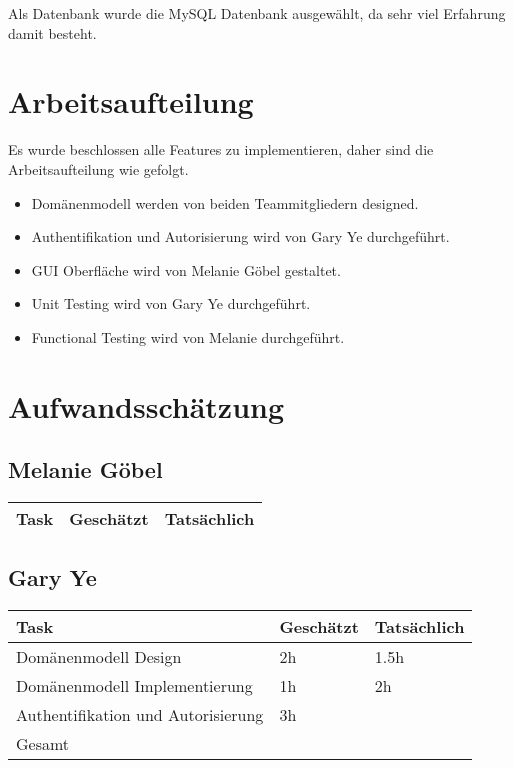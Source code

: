 \documentclass[11pt, a4paper]{article}
\begin{document}
Als Datenbank wurde die MySQL Datenbank ausgewählt, da sehr viel Erfahrung damit besteht.

\section{Arbeitsaufteilung}

Es wurde beschlossen alle Features zu implementieren, daher sind die Arbeitsaufteilung wie gefolgt. 

\begin{itemize}
  \item Domänenmodell werden von beiden Teammitgliedern designed.
  \item Authentifikation und Autorisierung wird von Gary Ye durchgeführt.
  \item GUI Oberfläche wird von Melanie Göbel gestaltet.
  \item Unit Testing wird von Gary Ye durchgeführt.
  \item Functional Testing wird von Melanie durchgeführt.
\end{itemize}

\section{Aufwandsschätzung}

\subsection*{Melanie Göbel}
\begin{center}
  \begin{tabular}{| l | l | l |}
    \hline
    Task & Geschätzt & Tatsächlich \\ \hline
    
  \end{tabular}
\end{center}


\subsection*{Gary Ye}
\begin{center}
  \begin{tabular}{| l | l | l |}
    \hline
    Task & Geschätzt & Tatsächlich \\ \hline
    Domänenmodell Design & 2h & 1.5h \\ \hline
		Domänenmodell Implementierung & 1h & 2h \\ \hline
    Authentifikation und Autorisierung & 3h & \\ \hline
		Gesamt & & \\ \hline
  \end{tabular}
\end{center}
\end{document}
